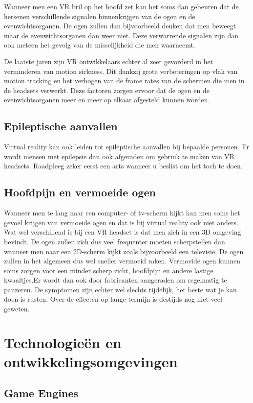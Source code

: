 Wanneer men een VR bril op het hoofd zet kan het soms dan gebeuren dat de hersenen verschillende signalen binnenkrijgen van de ogen en de evenwichtsorganen. De ogen zullen dan bijvoorbeeld denken dat men beweegt maar de evenwichtsorganen dan weer niet. Deze verwarrende signalen zijn dan ook meteen het gevolg van de misselijkheid die men waarneemt. 


De laatste jaren zijn VR ontwikkelaars echter al zeer gevorderd in het verminderen van motion sickness. Dit dankzij grote verbeteringen op vlak van motion tracking en het verhogen van de frame rates van de schermen die men in de headsets verwerkt. Deze factoren zorgen ervoor dat de ogen en de evenwichtsorganen meer en meer op elkaar afgesteld kunnen worden.

\subsection{Epileptische aanvallen}
Virtual reality kan ook leiden tot epileptische aanvallen bij bepaalde personen. Er wordt mensen met epilepsie dan ook afgeraden om gebruik te maken van VR headsets. Raadpleeg zeker eerst een arts wanneer u beslist om het toch te doen.

\subsection{Hoofdpijn en vermoeide ogen}
Wanneer men te lang naar een computer- of tv-scherm kijkt kan men soms het gevoel krijgen van vermoeide ogen en dat is bij virtual reality ook niet anders. Wat wel verschillend is bij een VR headset is dat men zich in een 3D omgeving bevindt. De ogen zullen zich dus veel frequenter moeten scherpstellen dan wanneer men naar een 2D-scherm kijkt zoals bijvoorbeeld een televisie. De ogen zullen in het algemeen dus wel sneller vermoeid  raken. Vermoeide ogen kunnen soms zorgen voor een minder scherp zicht, hoofdpijn en andere lastige kwaaltjes.Er wordt dan ook door fabricanten aangeraden om regelmatig te pauzeren. De symptomen zijn echter wel slechts tijdelijk, het beste wat je kan doen is rusten. Over de effecten op lange termijn is destijds nog niet veel geweten.


\section{Technologieën en ontwikkelingsomgevingen}
\subsection{Game Engines}

